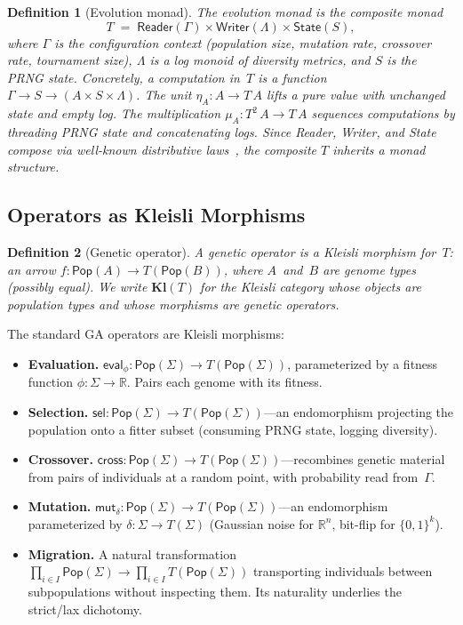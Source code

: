 \documentclass[submission,copyright,creativecommons]{eptcs}
\newtheorem{definition}{Definition}
\begin{document}
\begin{definition}[Evolution monad]
\label{def:evo-monad}
The \emph{evolution monad} is the composite monad
\[
  T \;=\; \mathsf{Reader}(\Gamma) \times \mathsf{Writer}(\Lambda) \times \mathsf{State}(S),
\]
where $\Gamma$ is the configuration context (population size,
mutation rate, crossover rate, tournament size), $\Lambda$ is a log
monoid of diversity metrics, and $S$ is the PRNG state.
Concretely, a computation in~$T$ is a function
$\Gamma \to S \to (A \times S \times \Lambda)$.
The unit $\eta_A : A \to T\,A$ lifts a pure value with unchanged
state and empty log. The multiplication
$\mu_A : T^2\,A \to T\,A$ sequences computations by threading
PRNG state and concatenating logs.
Since Reader, Writer, and State compose via well-known distributive
laws~\cite{moggi1991notions}, the composite $T$ inherits a monad
structure.
\end{definition}

\subsection{Operators as Kleisli Morphisms}
\label{sec:kleisli-ops}

\begin{definition}[Genetic operator]
A \emph{genetic operator} is a Kleisli morphism for~$T$:
an arrow $f : \mathsf{Pop}(A) \to T(\mathsf{Pop}(B))$, where $A$~and~$B$
are genome types (possibly equal). We write $\mathbf{Kl}(T)$ for the
Kleisli category whose objects are population types and whose morphisms
are genetic operators.
\end{definition}

The standard GA operators are Kleisli morphisms:
\begin{itemize}
\item \textbf{Evaluation.} $\mathsf{eval}_\phi : \mathsf{Pop}(\Sigma) \to
  T(\mathsf{Pop}(\Sigma))$, parameterized by a fitness function
  $\phi : \Sigma \to \mathbb{R}$. Pairs each genome with its fitness.

\item \textbf{Selection.} $\mathsf{sel} : \mathsf{Pop}(\Sigma) \to
  T(\mathsf{Pop}(\Sigma))$---an endomorphism projecting the
  population onto a fitter subset (consuming PRNG state, logging
  diversity).

\item \textbf{Crossover.} $\mathsf{cross} : \mathsf{Pop}(\Sigma) \to
  T(\mathsf{Pop}(\Sigma))$---recombines genetic material from pairs
  of individuals at a random point, with probability read from~$\Gamma$.

\item \textbf{Mutation.} $\mathsf{mut}_\delta : \mathsf{Pop}(\Sigma)
  \to T(\mathsf{Pop}(\Sigma))$---an endomorphism parameterized by
  $\delta : \Sigma \to T(\Sigma)$
  (Gaussian noise for $\mathbb{R}^n$, bit-flip for $\{0,1\}^k$).

\item \textbf{Migration.} A natural transformation
  $\prod_{i \in I} \mathsf{Pop}(\Sigma) \to
  \prod_{i \in I} T(\mathsf{Pop}(\Sigma))$
  transporting individuals between subpopulations without inspecting
  them. Its naturality underlies the strict/lax dichotomy.
\end{itemize}
\end{document}

